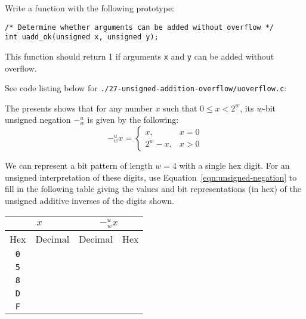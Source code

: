 \documentclass[12pt]{article}
\newenvironment{ex}[2][Exercise]{\begin{trivlist}
		\item[\hskip \labelsep {\bfseries #1}\hskip \labelsep {\bfseries #2.}]}{\end{trivlist}}
\newenvironment{sol}[1][Solution]{\begin{trivlist}
		\item[\hskip \labelsep {\bfseries #1:}]}{\end{trivlist}}
\begin{document}
\begin{ex}{2.27}
	Write a function with the following prototype:
	\begin{lstlisting}
/* Determine whether arguments can be added without overflow */
int uadd_ok(unsigned x, unsigned y);
	\end{lstlisting}
	This function should return 1 if arguments \texttt{x} and \texttt{y} can be
	added without overflow.
\end{ex}

\begin{sol}
	See code listing below for \texttt{./27-unsigned-addition-overflow/uoverflow.c}:
	
\end{sol}

\begin{ex}{2.28}
	The presents shows that for any number $x$ such that $0\leq x<2^w$, its $w$-bit
	unsigned negation $-^u_w$ is given by the following:
	\begin{equation}\label{eqn:unsigned-negation}
		-^u_wx=\begin{cases}
			x, & x = 0\\
			2^w-x, & x > 0
		\end{cases}
	\end{equation}

	\noindent We can represent a bit pattern of length $w=4$ with a single hex digit. For an
	unsigned interpretation of these digits, use Equation~\ref{eqn:unsigned-negation}
	to fill in the following table giving the values and bit representations (in hex)
	of the unsigned additive inverses of the digits shown.
	\begin{center}
		\begin{tabular}{cccc}
			\multicolumn{2}{c}{$x$} & \multicolumn{2}{c}{$-^u_wx$}\\
			\hline
			Hex & Decimal & Decimal & Hex\\
			\hline
			\texttt{0} & \makebox[1cm]{\hrulefill} & \makebox[1cm]{\hrulefill} & \makebox[1cm]{\hrulefill}\\
			\texttt{5} & \makebox[1cm]{\hrulefill} & \makebox[1cm]{\hrulefill} & \makebox[1cm]{\hrulefill}\\
			\texttt{8} & \makebox[1cm]{\hrulefill} & \makebox[1cm]{\hrulefill} & \makebox[1cm]{\hrulefill}\\
			\texttt{D} & \makebox[1cm]{\hrulefill} & \makebox[1cm]{\hrulefill} & \makebox[1cm]{\hrulefill}\\
			\texttt{F} & \makebox[1cm]{\hrulefill} & \makebox[1cm]{\hrulefill} & \makebox[1cm]{\hrulefill}
		\end{tabular}
	\end{center}
\end{ex}
\end{document}
